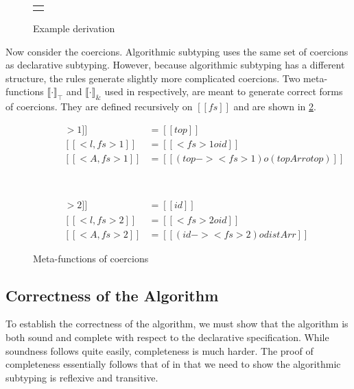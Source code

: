 \begin{figure}[t]
\begin{footnotesize}
\begin{tabular}{l}
\begin{mathpar}
      \end{mathpar}

  \end{tabular}
\end{footnotesize}
  \caption{Example derivation}
  \label{fig:example_deri}
\end{figure}


Now consider the coercions. Algorithmic subtyping uses the same set of
coercions as declarative subtyping. However, because algorithmic
subtyping has a different structure, the rules generate slightly more
complicated coercions. Two meta-functions $\llbracket \cdot \rrbracket_{\top}$
and $\llbracket \cdot \rrbracket_{\&}$ used in  respectively,
are meant to generate correct forms of coercions. They are defined recursively
on $[[fs]]$ and are shown in \cref{fig:coercion}.



\begin{figure}[t]
    \centering
    \begin{subfigure}[b]{0.5\textwidth}
      \begin{align*}
        [[ < [] >1 ]] &=  [[top]] \\
        [[ < { l } , fs >1 ]] &= [[ < fs >1 o id  ]] \\
        [[ < A , fs >1 ]] &= [[(top -> < fs >1) o (topArr o top)]]
      \end{align*}
    \end{subfigure} ~
    \begin{subfigure}[b]{0.45\textwidth}
      \begin{align*}
        [[ < [] >2 ]] &=  [[id]] \\
        [[ < { l } , fs >2 ]] &= [[ < fs >2 o id  ]] \\
        [[ < A , fs >2 ]] &= [[(id -> < fs >2) o distArr]]
      \end{align*}
    \end{subfigure}
    \caption{Meta-functions of coercions}\label{fig:coercion}
\end{figure}

\subsection{Correctness of the Algorithm}

To establish the correctness of the algorithm, we must show that the algorithm
is both sound and complete with respect to the declarative specification. While
soundness follows quite easily, completeness is much harder. The proof of
completeness essentially follows that of \citet{pierce1989decision}
in that we
need to show the algorithmic subtyping is reflexive and
transitive. 


